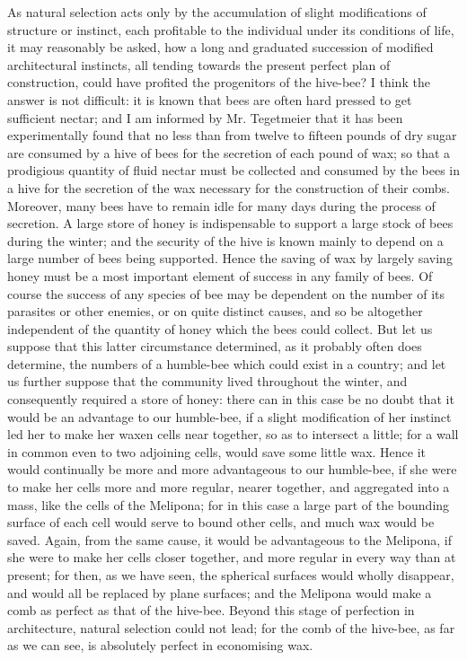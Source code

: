 As natural selection acts only by the accumulation of slight modifications of structure or instinct, each profitable to the individual under its conditions of life, it may reasonably be asked, how a long and graduated succession of modified architectural instincts, all tending towards the present perfect plan of construction, could have profited the progenitors of the hive-bee? I think the answer is not difficult: it is known that bees are often hard pressed to get sufficient nectar; and I am informed by Mr. Tegetmeier that it has been experimentally found that no less than from twelve to fifteen pounds of dry sugar are consumed by a hive of bees for the secretion of each pound of wax; so that a prodigious quantity of fluid nectar must be collected and consumed by the bees in a hive for the secretion of the wax necessary for the construction of their combs. Moreover, many bees have to remain idle for many days during the process of secretion. A large store of honey is indispensable to support a large stock of bees during the winter; and the security of the hive is known mainly to depend on a large number of bees being supported. Hence the saving of wax by largely saving honey must be a most important element of success in any family of bees. Of course the success of any species of bee may be dependent on the number of its parasites or other enemies, or on quite distinct causes, and so be altogether independent of the quantity of honey which the bees could collect. But let us suppose that this latter circumstance determined, as it probably often does determine, the numbers of a humble-bee which could exist in a country; and let us further suppose that the community lived throughout the winter, and consequently required a store of honey: there can in this case be no doubt that it would be an advantage to our humble-bee, if a slight modification of her instinct led her to make her waxen cells near together, so as to intersect a little; for a wall in common even to two adjoining cells, would save some little wax. Hence it would continually be more and more advantageous to our humble-bee, if she were to make her cells more and more regular, nearer together, and aggregated into a mass, like the cells of the Melipona; for in this case a large part of the bounding surface of each cell would serve to bound other cells, and much wax would be saved. Again, from the same cause, it would be advantageous to the Melipona, if she were to make her cells closer together, and more regular in every way than at present; for then, as we have seen, the spherical surfaces would wholly disappear, and would all be replaced by plane surfaces; and the Melipona would make a comb as perfect as that of the hive-bee. Beyond this stage of perfection in architecture, natural selection could not lead; for the comb of the hive-bee, as far as we can see, is absolutely perfect in economising wax.
